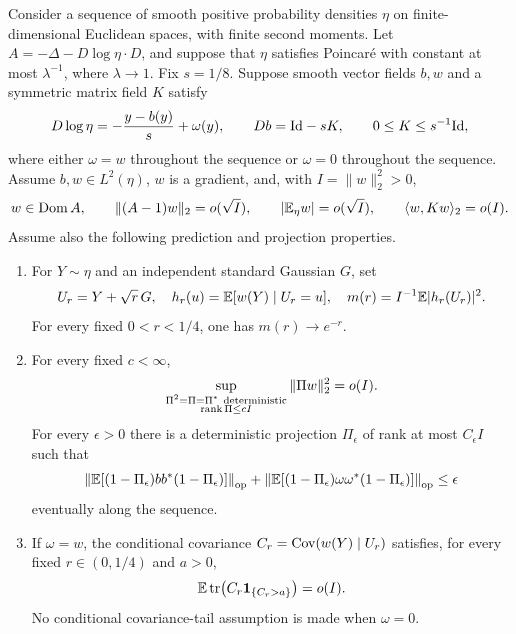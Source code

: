 \begin{proposition}\label{prop:hierarchy}
Consider a sequence of smooth positive probability densities $\eta$ on
finite-dimensional Euclidean spaces, with finite second moments.  Let
$A=-\Delta-D\log\eta\cdot D$, and suppose that $\eta$ satisfies Poincar\'e
with constant at most $\lambda^{-1}$, where $\lambda\to1$.  Fix $s=1/8$.
Suppose smooth vector fields $b,w$ and a symmetric matrix field $K$ satisfy
\[
 D\log\eta=-\frac{y-b(y)}s+\omega(y),\qquad
 Db=\mathrm{Id}-sK,\qquad 0\le K\le s^{-1}\mathrm{Id},
\]
where either $\omega=w$ throughout the sequence or $\omega=0$ throughout
the sequence.  Assume $b,w\in L^2(\eta)$, $w$ is a gradient, and, with
$I=\|w\|_2^2>0$,
\begin{equation}\label{eq:hierarchy-initial}
 w\in\operatorname{Dom} A,\qquad
 \|(A-1)w\|_2=o(\sqrt I),\qquad
 |\mathbb E_\eta w|=o(\sqrt I),\qquad
 \langle w,Kw\rangle_2=o(I).
\end{equation}
Assume also the following prediction and projection properties.
\begin{enumerate}[label=\textup{(\roman*)}]
\item For $Y\sim\eta$ and an independent standard Gaussian $G$, set
\[
 U_r=Y+\sqrt r\,G,\quad h_r(u)=\mathbb E[w(Y)\mid U_r=u],\quad
 m(r)=I^{-1}\mathbb E|h_r(U_r)|^2.
\]
For every fixed $0<r<1/4$, one has $m(r)\to e^{-r}$.
\item For every fixed $c<\infty$,
\begin{equation}\label{eq:hierarchy-input-projection}
 \sup_{\substack{\Pi^2=\Pi=\Pi^*\ \mathrm{deterministic}\\
                   \operatorname{rank}\Pi\le cI}}
       \|\Pi w\|_2^2=o(I).
\end{equation}
For every $\epsilon>0$ there is a deterministic projection $\Pi_\epsilon$
of rank at most $C_\epsilon I$ such that
\begin{equation}\label{eq:hierarchy-input-outliers}
 \left\|\mathbb E[(1-\Pi_\epsilon)bb^*(1-\Pi_\epsilon)]\right\|_{\mathrm{op}}
 +\left\|\mathbb E[(1-\Pi_\epsilon)\omega\omega^*
                  (1-\Pi_\epsilon)]\right\|_{\mathrm{op}}\le\epsilon
\end{equation}
eventually along the sequence.
\item If $\omega=w$, the conditional covariance
$C_r=\operatorname{Cov}(w(Y)\mid U_r)$ satisfies, for every fixed $r\in(0,1/4)$ and
$a>0$,
\begin{equation}\label{eq:hierarchy-input-tail}
 \mathbb E\operatorname{tr}\bigl(C_r\mathbf 1_{\{C_r>a\}}\bigr)=o(I).
\end{equation}
No conditional covariance-tail assumption is made when $\omega=0$.

\end{enumerate}
\end{proposition}
